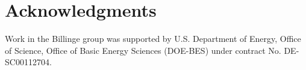 \documentclass[fleqn,10pt,lineno]{wlpeerj} %
\begin{document}
\section*{Acknowledgments}

Work in the Billinge group was supported by U.S. Department of Energy,
Office of Science, Office of Basic Energy Sciences (DOE-BES) under contract
No. DE-SC00112704.


\end{document}
